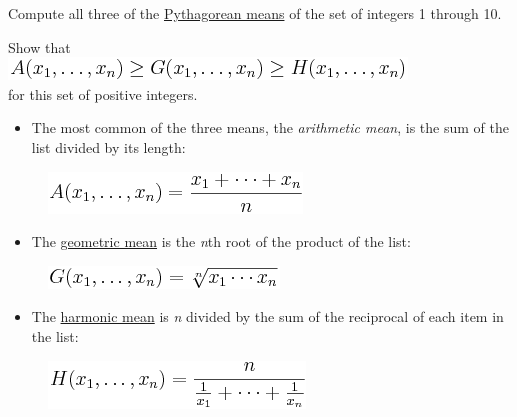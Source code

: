 Compute all three of the
\href{http://en.wikipedia.org/wiki/Pythagorean\_means}{Pythagorean
means} of the set of integers 1 through 10.

Show that \\
\includegraphics[scale=.6]{graphics/6d547901f0a5fb3819d16aca0048b3ed.png} \\
for this set of positive integers.

\begin{itemize}
\item The most common of the three means, the \emph{arithmetic mean},
  is the sum of the list divided by its length:
\end{itemize}

\begin{figure}[H]
\centering
\includegraphics[scale=.6]{graphics/2b72903b5dd461c777da13fde57f3ebb.png}
\end{figure}

\begin{itemize}
\item
  The \href{http://en.wikipedia.org/wiki/Geometric\_mean}{geometric
  mean} is the \emph{n}th root of the product of the list:
\end{itemize}

\begin{figure}[H]
\centering
\includegraphics[scale=.6]{graphics/12595bb2b15b5d8b7263aba68c137db3.png}
\end{figure}

\begin{itemize}
\item
  The \href{http://en.wikipedia.org/wiki/Harmonic\_mean}{harmonic mean}
  is \emph{n} divided by the sum of the reciprocal of each item in the
  list:
\end{itemize}

\begin{figure}[H]
\centering
\includegraphics[scale=.6]{graphics/7f1c92a1977747914e9c5127764a9be4.png}
\end{figure}

